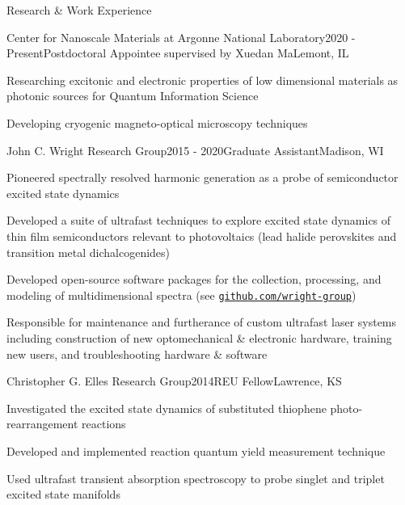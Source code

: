 \documentclass{resume} %
\begin{document}
\begin{rSection}{Research \& Work Experience}
	
\begin{rSubsection}{Center for Nanoscale Materials at Argonne National Laboratory}{2020 - Present}{Postdoctoral Appointee supervised by Xuedan Ma}{Lemont, IL}
	\item Researching excitonic and electronic properties of low dimensional materials as photonic sources for Quantum Information Science
	\item Developing cryogenic magneto-optical microscopy techniques 	
\end{rSubsection}

\begin{rSubsection}{John C. Wright Research Group}{2015 - 2020}{Graduate Assistant}{Madison, WI}
\item Pioneered spectrally resolved harmonic generation as a probe of semiconductor excited state dynamics
\item Developed a suite of ultrafast techniques to explore excited state dynamics of thin film semiconductors relevant to photovoltaics (lead halide perovskites and transition metal dichalcogenides)%
\item Developed open-source software packages for the  collection, processing, and modeling of multidimensional spectra (see \href{http://github.com/wright-group}{\texttt{github.com/wright-group}})
\item Responsible for maintenance and furtherance of custom ultrafast laser systems including construction of new optomechanical \& electronic hardware, training new users, and troubleshooting hardware \& software

\end{rSubsection}

\begin{rSubsection}{Christopher G. Elles Research Group}{2014}{REU Fellow}{Lawrence, KS}
	\item Investigated the excited state dynamics of substituted thiophene photo-rearrangement reactions
	\item Developed and implemented reaction quantum yield measurement technique
	\item Used ultrafast transient absorption spectroscopy to probe singlet and triplet excited state manifolds
\end{rSubsection}


\end{rSection}
\end{document}
